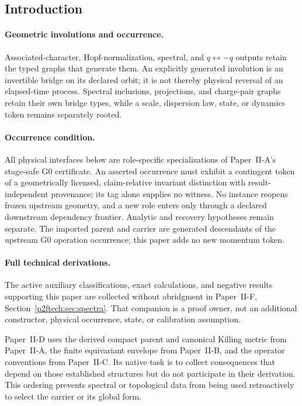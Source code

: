 \documentclass[12pt,a4paper]{article}
\begin{document}
\subsection{Introduction}
\label{p2d:sec:introduction}
\paragraph{Geometric involutions and occurrence.}
Associated-character, Hopf-normalization, spectral, and \(q\leftrightarrow-q\)
outputs retain the typed graphs that generate them.  An explicitly generated
involution is an invertible bridge on its declared orbit; it is not thereby
physical reversal of an elapsed-time process.  Spectral inclusions,
projections, and charge-pair graphs retain their own bridge types, while a
scale, dispersion law, state, or dynamics token remains separately rooted.

\paragraph{Occurrence condition.}
All physical interfaces below are role-specific specializations of
Paper~II-A's stage-safe G0 certificate.  An asserted occurrence must exhibit a
contingent token of a geometrically licensed, claim-relative invariant
distinction with result-independent provenance; its tag alone supplies no
witness.  No instance reopens frozen upstream geometry, and a new role enters
only through a declared downstream dependency frontier.  Analytic and recovery
hypotheses remain separate.  The imported parent and carrier are generated
descendants of the upstream G0 operation occurrence; this paper adds no new
momentum token.


\paragraph{Full technical derivations.}
The active auxiliary classifications, exact calculations, and negative
results supporting this paper are collected without abridgment in
Paper~II-F, Section~\ref{p2ftech:sec:spectra}.
That companion is a proof owner, not an additional constructor,
physical occurrence, state, or calibration assumption.

Paper~II-D uses the derived compact parent and canonical Killing metric from
Paper~II-A, the finite equivariant envelope from Paper~II-B, and the operator
conventions from Paper~II-C.  Its native task is to collect consequences that
depend on those established structures but do not participate in their
derivation.  This ordering prevents spectral or topological data from being
used retroactively to select the carrier or its global form.
\end{document}
